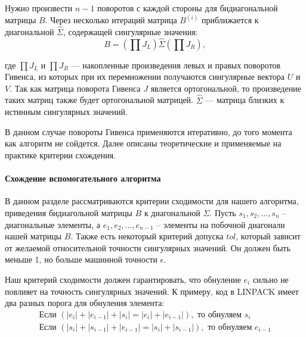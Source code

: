 \documentclass[12pt, a4paper]{report}
\theoremstyle{note}
\newcommand{\subsubsubsection}[1]{\paragraph{#1}}
\begin{document}
Нужно произвести \( n-1 \) поворотов с каждой стороны для бидиагональной матрицы \( B \). Через несколько итераций матрица \( B^{(i)} \) приближается к диагональной \( \widehat{\Sigma} \), содержащей сингулярные значения:
\begin{equation}
B = \left( \prod J_L \right) \widehat{\Sigma} \left( \prod J_R \right),
\end{equation}

где \( \prod J_L \) и \( \prod J_R \) — накопленные произведения левых и правых поворотов Гивенса, из которых при их перемножении получаются сингулярные вектора \( U \) и \( V \). Так как матрица поворота Гивенса $J$ является ортогональной, то произведение таких матриц также будет ортогональной матрицей.  $\widehat{\Sigma}$ — матрица близких к истинным сингулярных значений.

В данном случае повороты Гивенса применяются итеративно, до того момента как алгоритм не сойдется. Далее описаны теоретические и применяемые на практике критерии схождения.

\subsubsubsection{\textbf{Схождение вспомогательного алгоритма}}

В данном разделе рассматриваются критерии сходимости для нашего алгоритма, приведения бидиагольной матрицы $B$ к диагональной $\Sigma$. Пусть $s_1, s_2,...,s_n$ \--- диагональные элементы, а $e_1, e_2, ..., e_{n-1}$ \--- элементы на побочной диагонали нашей матрицы $B$. Также есть некоторый критерий допуска $tol$, который зависит от желаемой относительной точности сингулярных значений. Он должен быть меньше 1, но больше машинной точности $\epsilon$.

Наш критерий сходимости должен гарантировать, что обнуление $e_i$ сильно не повлияет на точность сингулярных значений. К примеру, код в LINPACK имеет два разных порога для обнуления элемента:
\begin{align}
\text{Если } (|e_i| + |e_{i-1}| + |s_i| = |e_i| + |e_{i-1}|), \text{ то обнуляем }s_i
\\\text{Если } (|s_i| + |s_{i-1}| + |e_{i-1}| = |s_i| + |s_{i-1}|), \text{ то обнуляем }e_{i-1}
\end{align}
\end{document}
